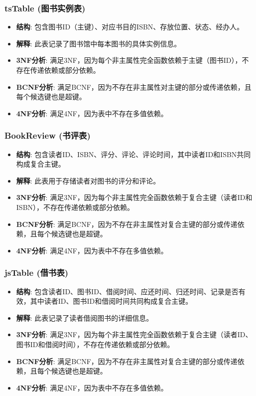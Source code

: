 \documentclass{ctexart}
\begin{document}
\subsubsection{tsTable (图书实例表)}
\begin{itemize}
    \item \textbf{结构}: 包含图书ID（主键）、对应书目的ISBN、存放位置、状态、经办人。
    \item \textbf{解释}: 此表记录了图书馆中每本图书的具体实例信息。
    \item \textbf{3NF分析}: 满足3NF，因为每个非主属性完全函数依赖于主键（图书ID），不存在传递依赖或部分依赖。
    \item \textbf{BCNF分析}: 满足BCNF，因为不存在非主属性对主键的部分或传递依赖，且每个候选键也是超键。
    \item \textbf{4NF分析}: 满足4NF，因为表中不存在多值依赖。
\end{itemize}

\subsubsection{BookReview (书评表)}
\begin{itemize}
    \item \textbf{结构}: 包含读者ID、ISBN、评分、评论、评论时间，其中读者ID和ISBN共同构成复合主键。
    \item \textbf{解释}: 此表用于存储读者对图书的评分和评论。
    \item \textbf{3NF分析}: 满足3NF，因为每个非主属性完全函数依赖于复合主键（读者ID和ISBN），不存在传递依赖或部分依赖。
    \item \textbf{BCNF分析}: 满足BCNF，因为不存在非主属性对复合主键的部分或传递依赖，且每个候选键也是超键。
    \item \textbf{4NF分析}: 满足4NF，因为表中不存在多值依赖。
\end{itemize}

\subsubsection{jsTable (借书表)}
\begin{itemize}
    \item \textbf{结构}: 包含读者ID、图书ID、借阅时间、应还时间、归还时间、记录是否有效，其中读者ID、图书ID和借阅时间共同构成复合主键。
    \item \textbf{解释}: 此表记录了读者借阅图书的详细信息。
    \item \textbf{3NF分析}: 满足3NF，因为每个非主属性完全函数依赖于复合主键（读者ID、图书ID和借阅时间），不存在传递依赖或部分依赖。
    \item \textbf{BCNF分析}: 满足BCNF，因为不存在非主属性对复合主键的部分或传递依赖，且每个候选键也是超键。
    \item \textbf{4NF分析}: 满足4NF，因为表中不存在多值依赖。
\end{itemize}
\end{document}
